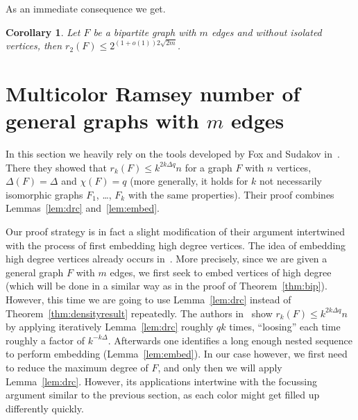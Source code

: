 \documentclass[reqno]{amsart}
\newtheorem{corollary}       [theorem] {Corollary}
\theoremstyle{remark}
\begin{document}
As an immediate consequence we get.
\begin{corollary}
Let $F$ be a bipartite graph with $m$ edges and without isolated vertices, then $r_2(F) \leq 2^{(1+o(1))2 \sqrt{2m}}$. 
\end{corollary}


\section{Multicolor Ramsey number of general graphs with \texorpdfstring{$m$}{m} edges}\label{sec:multi}
In this section we heavily rely on the tools developed by Fox and Sudakov in~\cite{FoxSud09a}. There they showed that $r_k(F)\le k^{2k\Delta q}n$ for  a 
graph $F$ with $n$ vertices, $\Delta(F)=\Delta$ and $\chi(F)=q$ (more generally, it holds for $k$ not necessarily isomorphic graphs $F_1$, \ldots, $F_k$ with the same properties). 
Their proof combines Lemmas~\ref{lem:drc} and~\ref{lem:embed}. 

Our proof strategy is in fact a slight modification of their argument 
intertwined with the process of  first embedding high degree vertices. The idea of embedding high degree vertices already occurs in~\cite{AKS03}. 
More precisely, since we are given a general graph $F$ with $m$ edges, we first seek to embed vertices of high degree (which will be done 
in a similar way as in the proof of Theorem~\ref{thm:bip}). 
However, this time we are going to use Lemma~\ref{lem:drc} instead of Theorem~\ref{thm:densityresult} repeatedly. 
The authors in~\cite{FoxSud09a}  show $r_k(F)\le k^{2k\Delta q}n$ by  applying 
iteratively Lemma~\ref{lem:drc} roughly $qk$ times, ``loosing'' each time roughly a factor of $k^{-k\Delta}$. 
Afterwards one identifies a long enough nested sequence to perform embedding 
(Lemma~\ref{lem:embed}). In our case however, we first need to reduce the maximum degree of $F$, 
and only then we will apply Lemma~\ref{lem:drc}. However, its applications intertwine with the 
focussing argument similar to the previous section, as each color might get filled up differently quickly.
\end{document}
